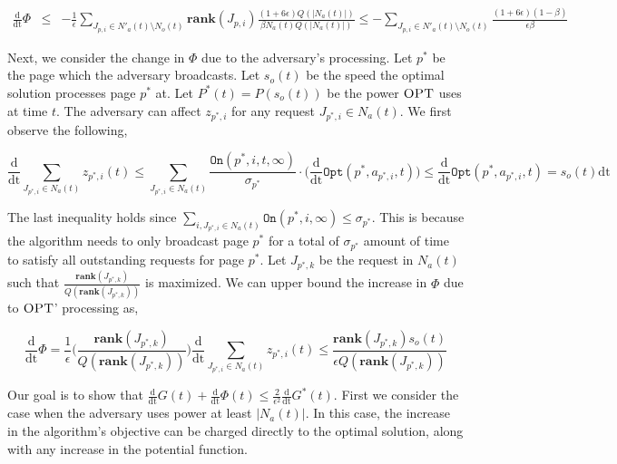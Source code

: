 \documentclass[11pt]{article}
\newcommand{\opt}{\textrm{\sc OPT}}
\newcommand{\eps}{\epsilon}
\newcommand{\On}{\texttt{On}}
\newcommand{\Opt}{\texttt{Opt}}
\newcommand{\ddphi}{\frac{\mathrm{d}}{\mathrm{dt}} \Phi}
\newcommand{\ddopt}{\frac{\mathrm{d}}{\mathrm{dt}} G^*}
\newcommand{\ddg}{\frac{\mathrm{d}}{\mathrm{dt}} G}
\newcommand{\ddt}{\frac{\mathrm{d}}{\mathrm{dt}} }
\newcommand{\dt}{\mathrm{dt}}
\newcommand{\rank}{\mathbf{rank}}
\begin{document}
\begin{eqnarray}
\ddphi &\leq& - \frac{1}{\eps}\sum_{J_{p,i} \in N'_a(t) \setminus N_o(t) } \rank(J_{p,i}) \frac{(1+6\eps)Q(|N_a(t)|)}{\beta N_a(t) Q(|N_a(t)|)}  \leq  -\sum_{J_{p,i} \in N'_a(t) \setminus N_o(t) } \frac{(1+6\eps)(1-\beta)}{\eps\beta}  \label{eqn:algproc}
\end{eqnarray}

Next, we consider the change in $\Phi$ due to the adversary's processing.  Let $p^*$ be the page which the adversary broadcasts.  Let $s_o(t)$ be the speed the optimal solution processes page $p^*$ at.  Let $P^*(t) = P(s_o(t))$ be the power $\opt$ uses at time $t$.    The adversary can affect $z_{p^*,i}$ for any request $J_{p^*,i} \in N_a(t)$.  We first observe the following,

$$\ddt \sum_{ J_{p^*,i} \in N_a(t)} z_{p^*,i}(t)  \leq \sum_{ J_{p^*,i} \in N_a(t)} \frac{\On(p^*,i,t,\infty)}{\sigma_{p^*}} \cdot \Big(\ddt \Opt(p^*,a_{p^*,i},t)  \Big) \leq \ddt \Opt(p^*,a_{p^*,i},t) = s_o(t) \dt $$

The last inequality holds since $\sum_{i, J_{p^*,i} \in N_a(t)} \On(p^*,i,\infty) \leq \sigma_{p^*}$.  This is because the algorithm needs to only broadcast page $p^*$ for a total of $\sigma_{p^*}$ amount of time to satisfy all outstanding requests for page $p^*$. Let $J_{p^*,k}$ be the request in $N_a(t)$ such that $\frac{\rank(J_{p^*,k})}{Q(\rank(J_{p^*,k}))}$ is maximized.  We can upper bound the increase in $\Phi$ due to $\opt$' processing as,

$$\ddphi = \frac{1}{\eps} \Big ( \frac{\rank(J_{p^*,k})}{Q(\rank(J_{p^*,k}))} \Big) \ddt \sum_{ J_{p^*,i} \in N_a(t)}z_{p^*,i}(t) \leq  \frac{\rank(J_{p^*,k})s_o(t)}{\eps Q(\rank(J_{p^*,k}))}$$

Our goal is to show that $\ddg(t) + \ddphi(t) \leq \frac{2}{\eps^2} \ddopt(t)$.  First we consider the case when the adversary uses power at least $|N_a(t)|$.  In this case, the increase in the algorithm's objective can be charged directly to the optimal solution, along with any increase in the potential function.  
\end{document}

